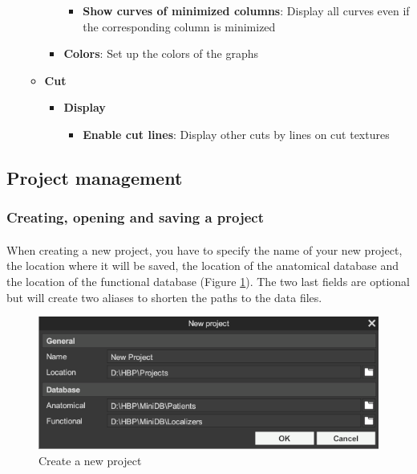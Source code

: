 \documentclass[a4paper]{article}
\begin{document}
\begin{itemize}
\begin{itemize}
\begin{itemize}
\begin{itemize}
\item \textbf{Show curves of minimized columns}: Display all curves even if the corresponding column is minimized
\end{itemize}
\item \textbf{Colors}: Set up the colors of the graphs
\end{itemize}
\item \textbf{Cut}
\begin{itemize}
\item \textbf{Display}
\begin{itemize}
\item \textbf{Enable cut lines}: Display other cuts by lines on cut textures
\end{itemize}
\end{itemize}
\end{itemize}
\end{itemize}
\subsection{Project management}
\subsubsection{Creating, opening and saving a project}
\paragraph{} When creating a new project, you have to specify the name of your new project, the location where it will be saved, the location of the anatomical database and the location of the functional database (Figure \ref{newProjectUI}). The two last fields are optional but will create two aliases to shorten the paths to the data files.
\begin{figure}[H]
\begin{center}
\includegraphics[scale=0.5]{NewProject.png}
\end{center}
\caption{\label{newProjectUI}Create a new project}
\end{figure}
\end{document}
